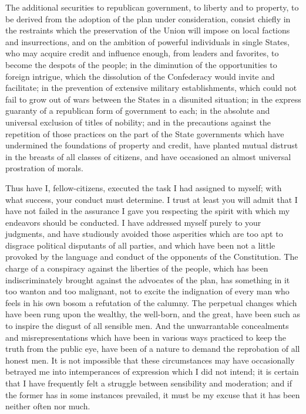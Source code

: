 The additional securities to republican government, to liberty and to property, to be derived from the adoption of the plan under consideration, consist chiefly in the restraints which the preservation of the Union will impose on local factions and insurrections, and on the ambition of powerful individuals in single States, who may acquire credit and influence enough, from leaders and favorites, to become the despots of the people; in the diminution of the opportunities to foreign intrigue, which the dissolution of the Confederacy would invite and facilitate; in the prevention of extensive military establishments, which could not fail to grow out of wars between the States in a disunited situation; in the express guaranty of a republican form of government to each; in the absolute and universal exclusion of titles of nobility; and in the precautions against the repetition of those practices on the part of the State governments which have undermined the foundations of property and credit, have planted mutual distrust in the breasts of all classes of citizens, and have occasioned an almost universal prostration of morals.

Thus have I, fellow-citizens, executed the task I had assigned to myself; with what success, your conduct must determine. 
I trust at least you will admit that I have not failed in the assurance I gave you respecting the spirit with which my endeavors should be conducted. 
I have addressed myself purely to your judgments, and have studiously avoided those asperities which are too apt to disgrace political disputants of all parties, and which have been not a little provoked by the language and conduct of the opponents of the Constitution. 
The charge of a conspiracy against the liberties of the people, which has been indiscriminately brought against the advocates of the plan, has something in it too wanton and too malignant, not to excite the indignation of every man who feels in his own bosom a refutation of the calumny. 
The perpetual changes which have been rung upon the wealthy, the well-born, and the great, have been such as to inspire the disgust of all sensible men. 
And the unwarrantable concealments and misrepresentations which have been in various ways practiced to keep the truth from the public eye, have been of a nature to demand the reprobation of all honest men. 
It is not impossible that these circumstances may have occasionally betrayed me into intemperances of expression which I did not intend; it is certain that I have frequently felt a struggle between sensibility and moderation; and if the former has in some instances prevailed, it must be my excuse that it has been neither often nor much.

